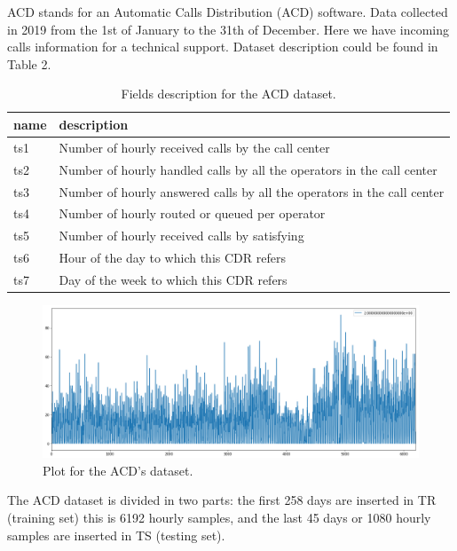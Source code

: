 \documentclass[12pt,a4paper]{article}
\theoremstyle{myplain}
\numberwithin{equation}{section}
\begin{document}
ACD stands for an Automatic Calls Distribution (ACD) software. Data collected in 2019 from the 1st of January to the 31th of December. Here we have incoming calls information for a technical support. Dataset description could be found in Table 2.
\begin{table}[h!]
\label{tab:table2}
\begin{tabular}{l|l}
name & description \\
\hline
ts1 & Number of hourly received calls by the call center \\
ts2 & Number of hourly handled calls by all the operators in the call center \\
ts3 & Number of hourly answered calls by all the operators in the call center \\
ts4 & Number of hourly routed or queued per operator \\
ts5 & Number of hourly received calls by satisfying \\
ts6 & Hour of the day to which this CDR refers \\
ts7 & Day of the week to which this CDR refers \\
\hline
\end{tabular}
\caption{Fields description for the ACD dataset.}
\end{table}


\begin{figure}
\includegraphics[scale=0.36]{ACD_data_plot}
\caption{Plot for the ACD's dataset.}
\end{figure}

The ACD dataset is divided in two parts: the first 258 days are inserted in TR (training set) this is 6192 hourly samples, and the last 45 days or 1080 hourly samples are inserted in TS (testing set).
\end{document}
